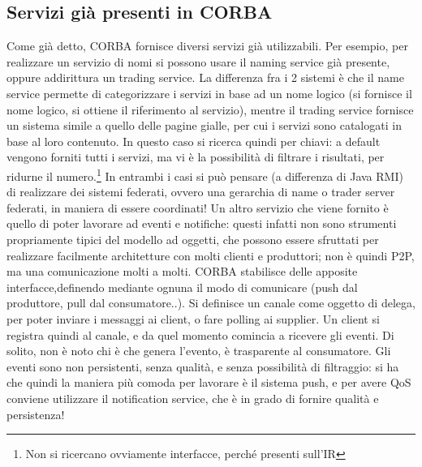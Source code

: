 \subsection{Servizi già presenti in CORBA}
Come già detto, CORBA fornisce diversi servizi già utilizzabili.
Per esempio, per realizzare un servizio di nomi si possono usare il naming service già presente, oppure addirittura un
trading service. La differenza fra i 2 sistemi è che il name service permette di categorizzare i servizi in base ad
un nome logico (si fornisce il nome logico, si ottiene il riferimento al servizio), mentre il trading service fornisce
un sistema simile a quello delle pagine gialle, per cui i servizi sono catalogati in base al loro contenuto. In questo
caso si ricerca quindi per chiavi: a default vengono forniti tutti i servizi, ma vi è la possibilità di filtrare i
risultati, per ridurne il numero.\footnote{Non si ricercano ovviamente interfacce, perché presenti sull'IR}
In entrambi i casi si può pensare (a differenza di Java RMI) di realizzare dei sistemi federati, ovvero una gerarchia di
name o trader server federati, in maniera di essere coordinati!
Un altro servizio che viene fornito è quello di poter lavorare ad eventi e notifiche: questi infatti non sono strumenti
propriamente tipici del modello ad oggetti, che possono essere sfruttati per realizzare facilmente architetture con
molti clienti e produttori; non è quindi P2P, ma una comunicazione molti a molti.
CORBA stabilisce delle apposite interfacce,definendo mediante ognuna il modo di comunicare (push dal produttore, pull dal
consumatore..). Si definisce un canale come oggetto di delega, per poter inviare i messaggi ai client, o fare polling ai
supplier. Un client si registra quindi al canale, e da quel momento comincia a ricevere gli eventi.
Di solito, non è noto chi è che genera l'evento, è trasparente al consumatore.
Gli eventi sono non persistenti, senza qualità, e senza possibilità di filtraggio: si ha che quindi la maniera più
comoda per lavorare è il sistema push, e per avere QoS conviene utilizzare il notification service, che è in grado di
fornire qualità e persistenza!